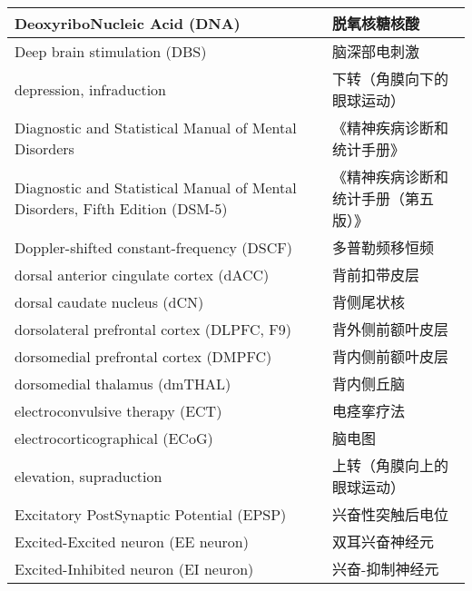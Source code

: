 \begin{longtable}{lll}
	\midrule
	DeoxyriboNucleic Acid (DNA)     &&  脱氧核糖核酸  \\
	
	\midrule
	Deep brain stimulation (DBS)     &&  脑深部电刺激  \\
	
	\midrule
	depression, infraduction     &&  下转（角膜向下的眼球运动）  \\
	
	\midrule
	Diagnostic and Statistical Manual of 	Mental Disorders     &&  《精神疾病诊断和统计手册》  \\
	
	\midrule
	Diagnostic and Statistical Manual of 	Mental Disorders, Fifth Edition (DSM-5)     &&  《精神疾病诊断和统计手册（第五版）》  \\
	
	\midrule
	Doppler-shifted constant-frequency (DSCF)     &&  多普勒频移恒频  \\
	
	\midrule
	dorsal anterior cingulate cortex (dACC)     &&  背前扣带皮层  \\
	
	\midrule
	dorsal caudate nucleus (dCN)     &&  背侧尾状核  \\
	
	\midrule
	dorsolateral prefrontal cortex (DLPFC, F9)     &&  背外侧前额叶皮层  \\
	
	\midrule
	dorsomedial prefrontal cortex (DMPFC)     &&  背内侧前额叶皮层  \\
	
	\midrule
	dorsomedial thalamus (dmTHAL)     &&  背内侧丘脑  \\
	
	\midrule
	electroconvulsive therapy (ECT)     &&  电痉挛疗法  \\
	
	\midrule
	electrocorticographical (ECoG)     &&  脑电图  \\
	
	\midrule
	elevation, supraduction     &&  上转（角膜向上的眼球运动）  \\
	
	\midrule
	Excitatory PostSynaptic Potential (EPSP)     &&  兴奋性突触后电位  \\
	
	\midrule
	Excited-Excited neuron (EE neuron)     &&  双耳兴奋神经元  \\
	
	\midrule
	Excited-Inhibited neuron (EI neuron)     && 兴奋-抑制神经元   \\
	

\end{longtable}
